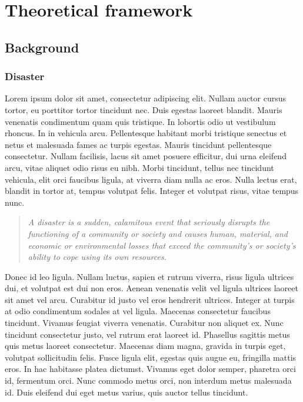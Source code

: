 \chapter{Theoretical framework} \label{framework}

\section{Background}
\subsection{Disaster}
Lorem ipsum dolor sit amet, consectetur adipiscing elit. Nullam auctor cursus tortor, eu porttitor tortor tincidunt nec. Duis egestas laoreet blandit. Mauris venenatis condimentum quam quis tristique. In lobortis odio ut vestibulum rhoncus. In in vehicula arcu. Pellentesque habitant morbi tristique senectus et netus et malesuada fames ac turpis egestas. Mauris tincidunt pellentesque consectetur. Nullam facilisis, lacus sit amet posuere efficitur, dui urna eleifend arcu, vitae aliquet odio risus eu nibh. Morbi tincidunt, tellus nec tincidunt vehicula, elit orci faucibus ligula, at viverra diam nulla ac eros. Nulla lectus erat, blandit in tortor at, tempus volutpat felis. Integer et volutpat risus, vitae tempus nunc.

\blockquote{\textit{A disaster is a sudden, calamitous event that seriously disrupts the functioning of a community or society and causes human, material, and economic or environmental losses that exceed the community’s or society’s ability to cope using its own resources.}}

Donec id leo ligula. Nullam luctus, sapien et rutrum viverra, risus ligula ultrices dui, et volutpat est dui non eros. Aenean venenatis velit vel ligula ultrices laoreet sit amet vel arcu. Curabitur id justo vel eros hendrerit ultrices. Integer at turpis at odio condimentum sodales at vel ligula. Maecenas consectetur faucibus tincidunt. Vivamus feugiat viverra venenatis. Curabitur non aliquet ex. Nunc tincidunt consectetur justo, vel rutrum erat laoreet id. Phasellus sagittis metus quis metus laoreet consectetur. Maecenas diam magna, gravida in turpis eget, volutpat sollicitudin felis. Fusce ligula elit, egestas quis augue eu, fringilla mattis eros. In hac habitasse platea dictumst. Vivamus eget dolor semper, pharetra orci id, fermentum orci. Nunc commodo metus orci, non interdum metus malesuada id. Duis eleifend dui eget metus varius, quis auctor tellus tincidunt.

